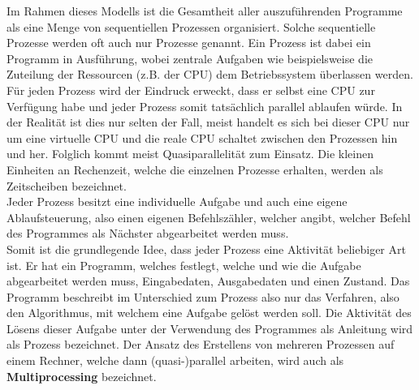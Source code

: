 				Im Rahmen dieses Modells ist die Gesamtheit aller auszuführenden Programme als eine Menge von sequentiellen Prozessen organisiert. Solche sequentielle Prozesse werden oft auch nur Prozesse genannt.
				Ein Prozess ist dabei ein Programm in Ausführung, wobei zentrale Aufgaben wie beispielsweise die Zuteilung der Ressourcen (z.B. der CPU) dem Betriebssystem überlassen werden.\\
				Für jeden Prozess wird der Eindruck erweckt, dass er selbst eine CPU zur Verfügung habe und jeder Prozess somit tatsächlich parallel ablaufen würde. In der Realität ist dies nur selten der Fall, meist handelt es sich bei dieser CPU nur um eine virtuelle CPU und die reale CPU schaltet zwischen den Prozessen hin und her. Folglich kommt meist Quasiparallelität zum Einsatz. Die kleinen Einheiten an Rechenzeit, welche die einzelnen Prozesse erhalten, werden als Zeitscheiben bezeichnet.\\
				Jeder Prozess besitzt eine individuelle Aufgabe und auch eine eigene Ablaufsteuerung, also einen eigenen Befehlszähler, welcher angibt, welcher Befehl des Programmes als Nächster abgearbeitet werden muss.\\
				Somit ist die grundlegende Idee, dass jeder Prozess eine Aktivität beliebiger Art ist. Er hat ein Programm, welches festlegt, welche und wie die Aufgabe abgearbeitet werden muss, Eingabedaten, Ausgabedaten und einen Zustand.
				Das Programm beschreibt im Unterschied zum Prozess also nur das Verfahren, also den Algorithmus, mit welchem eine Aufgabe gelöst werden soll. Die Aktivität des Lösens dieser Aufgabe unter der Verwendung des Programmes als Anleitung wird als Prozess bezeichnet.
				Der Ansatz des Erstellens von mehreren Prozessen auf einem Rechner, welche dann (quasi-)parallel arbeiten, wird auch als \textbf{Multiprocessing} bezeichnet. \cite{ModerneBetriebssysteme}
				
